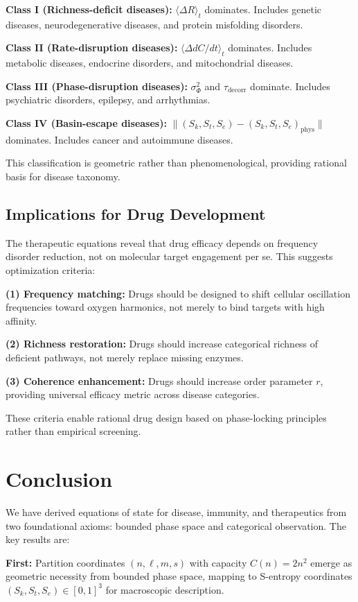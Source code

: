 \documentclass[11pt,twocolumn,a4paper]{article}
\theoremstyle{definition}
\theoremstyle{remark}
\newcommand{\Scoord}{(\Sk,\St,\Se)}
\newcommand{\Sk}{S_k}
\newcommand{\St}{S_t}
\newcommand{\Se}{S_e}
\newcommand{\taudecorr}{\tau_{\mathrm{decorr}}}
\begin{document}
\textbf{Class I (Richness-deficit diseases):} $\langle\Delta R\rangle_t$ dominates. Includes genetic diseases, neurodegenerative diseases, and protein misfolding disorders.

\textbf{Class II (Rate-disruption diseases):} $\langle\Delta dC/dt\rangle_t$ dominates. Includes metabolic diseases, endocrine disorders, and mitochondrial diseases.

\textbf{Class III (Phase-disruption diseases):} $\sigma_\Phi^2$ and $\taudecorr$ dominate. Includes psychiatric disorders, epilepsy, and arrhythmias.

\textbf{Class IV (Basin-escape diseases):} $\|\Scoord - \Scoord_{\mathrm{phys}}\|$ dominates. Includes cancer and autoimmune diseases.

This classification is geometric rather than phenomenological, providing rational basis for disease taxonomy.

\subsection{Implications for Drug Development}

The therapeutic equations reveal that drug efficacy depends on frequency disorder reduction, not on molecular target engagement per se. This suggests optimization criteria:

\textbf{(1) Frequency matching:} Drugs should be designed to shift cellular oscillation frequencies toward oxygen harmonics, not merely to bind targets with high affinity.

\textbf{(2) Richness restoration:} Drugs should increase categorical richness of deficient pathways, not merely replace missing enzymes.

\textbf{(3) Coherence enhancement:} Drugs should increase order parameter $r$, providing universal efficacy metric across disease categories.

These criteria enable rational drug design based on phase-locking principles rather than empirical screening.

\section{Conclusion}
\label{sec:conclusion}

We have derived equations of state for disease, immunity, and therapeutics from two foundational axioms: bounded phase space and categorical observation. The key results are:

\textbf{First:} Partition coordinates $(n,\ell,m,s)$ with capacity $C(n) = 2n^2$ emerge as geometric necessity from bounded phase space, mapping to S-entropy coordinates $(\Sk,\St,\Se) \in [0,1]^3$ for macroscopic description.
\end{document}
